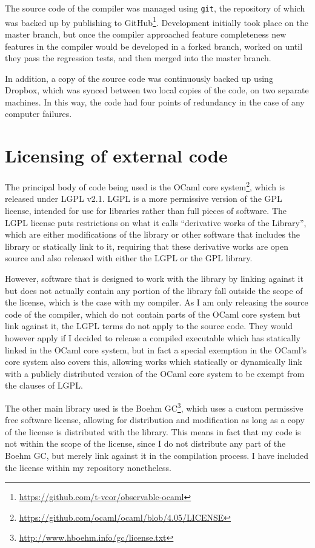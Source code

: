 \documentclass[12pt,a4paper,twoside,openright]{report}
\begin{document}
The source code of the compiler was managed using \texttt{git}, the repository
of which was backed up by publishing to
GitHub\footnote{\url{https://github.com/t-veor/observable-ocaml}}. Development
initially took place on the master branch, but once the compiler approached
feature completeness new features in the compiler would be developed in a forked
branch, worked on until they pass the regression tests, and then merged into the
master branch.

In addition, a copy of the source code was continuously backed up using Dropbox,
which was synced between two local copies of the code, on two separate machines.
In this way, the code had four points of redundancy in the case of any computer
failures.

\section{Licensing of external code}

The principal body of code being used is the OCaml core
system\footnote{\url{https://github.com/ocaml/ocaml/blob/4.05/LICENSE}}, which
is released under LGPL v2.1. LGPL is a more permissive version of the GPL
license, intended for use for libraries rather than full pieces of software. The
LGPL license puts restrictions on what it calls ``derivative works of the
Library'', which are either modifications of the library or other software that
includes the library or statically link to it, requiring that these derivative
works are open source and also released with either the LGPL or the GPL library.

However, software that is designed to work with the library by linking against
it but does not actually contain any portion of the library fall outside the
scope of the license, which is the case with my compiler. As I am only releasing
the source code of the compiler, which do not contain parts of the OCaml core
system but link against it, the LGPL terms do not apply to the source code. They
would however apply if I decided to release a compiled executable which has
statically linked in the OCaml core system, but in fact a special exemption in
the OCaml's core system also covers this, allowing works which statically or
dynamically link with a publicly distributed version of the OCaml core system
to be exempt from the clauses of LGPL.

The other main library used is the Boehm
GC\footnote{\url{http://www.hboehm.info/gc/license.txt}}, which uses a custom
permissive free software license, allowing for distribution and modification as
long as a copy of the license is distributed with the library. This means in
fact that my code is not within the scope of the license, since I do not
distribute any part of the Boehm GC, but merely link against it in the
compilation process. I have included the license within my repository
nonetheless.
\end{document}
